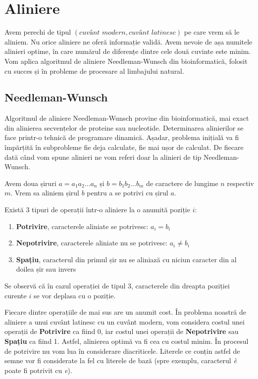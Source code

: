 \section{Aliniere}
Avem perechi de tipul $(\textit{cuvânt modern}, \textit{cuvânt latinesc})$ pe care vrem să le aliniem.
Nu orice aliniere ne oferă informație validă. Avem nevoie de așa numitele alinieri optime, în care
numărul de diferențe dintre cele două cuvinte este minim. Vom aplica algoritmul de aliniere 
Needleman-Wunsch\cite{needle} din bioinformatică, folosit cu succes și în probleme de procesare al
limbajului natural. 

\subsection{Needleman-Wunsch}
Algoritmul de aliniere Needleman-Wunsch provine din bioinformatică, mai exact din alinierea secvențelor
de proteine sau nucleotide. Determinarea alinierilor se face printr-o tehnică
de programare dinamică. Așadar, problema inițială va fi împărțită în subprobleme fie deja calculate,
fie mai ușor de calculat. De fiecare dată când vom spune alinieri ne vom referi doar la alinieri de tip
Needleman-Wunsch.

Avem doua șiruri $a=a_1a_2...a_n$ și $b=b_1b_2...b_m$ de caractere de lungime $n$ respectiv $m$. 
Vrem sa aliniem șirul $b$ pentru a se potrivi cu șirul $a$.  

Există 3 tipuri de operații într-o aliniere la o anumită poziție $i$:
\begin{enumerate}
  \item \textbf{Potrivire}, caracterele aliniate se potrivesc: $a_i=b_i$
  \item \textbf{Nepotrivire}, caracterele aliniate nu se potrivesc: $a_i \neq b_i$
  \item \textbf{Spațiu}, caracterul din primul șir nu se aliniază cu niciun caracter din al doilea șir
    sau invers
\end{enumerate}

Se observă că în cazul operației de tipul 3, caracterele din dreapta poziției curente $i$ se vor
deplasa cu o poziție.

Fiecare dintre operațiile de mai sus are un anumit cost. În problema noastră de aliniere a unui
cuvânt latinesc cu un cuvânt modern, vom considera costul unei operații de \textbf{Potrivire} ca fiind $0$,
iar costul unei operații de \textbf{Nepotrivire} sau \textbf{Spațiu} ca fiind 1. Astfel, alinierea
optimă va fi cea cu costul minim. În procesul de potrivire nu  vom lua în considerare diacriticele.
Literele ce conțin astfel de semne vor fi considerate la fel cu literele de bază (spre exemplu,
caracterul \textit{\`{e}} poate fi potrivit cu \textit{e}).

